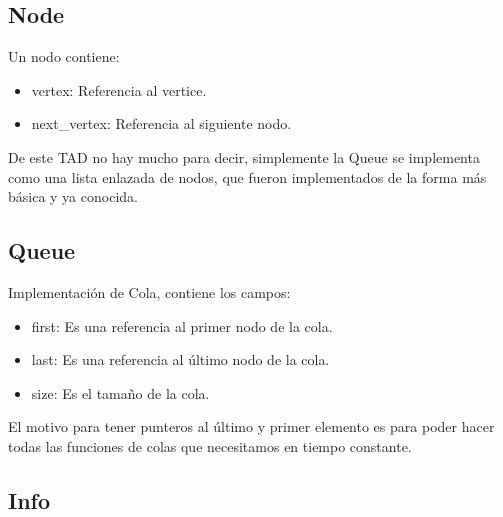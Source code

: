 \documentclass[11pt]{article}
\begin{document}
\subsection{Node}
\label{sec-5-3}

Un nodo contiene:
\begin{itemize}
\item vertex: Referencia al vertice.
\item next\_vertex: Referencia al siguiente nodo.
\end{itemize}
De este TAD no hay mucho para decir, simplemente la Queue se
implementa como una lista enlazada de nodos, que fueron implementados
de la forma más básica y ya conocida.
\subsection{Queue}
\label{sec-5-4}

Implementación de Cola, contiene los campos:
\begin{itemize}
\item first: Es una referencia al primer nodo de la cola.
\item last: Es una referencia al último nodo de la cola.
\item size: Es el tamaño de la cola.
\end{itemize}
El motivo para tener punteros al último y primer elemento es para
poder hacer todas las funciones de colas que necesitamos en tiempo constante.
\subsection{Info}
\label{sec-5-5}
\end{document}
